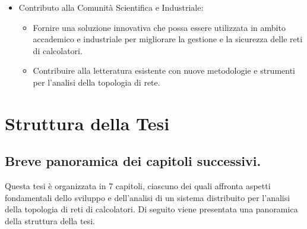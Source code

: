 \documentclass[target=bach,aauheader=,style=]{thud}
\begin{document}
\begin{itemize}


  \item Contributo alla Comunità Scientifica e Industriale:
    \begin{itemize}
      \item Fornire una soluzione innovativa che possa essere utilizzata in ambito accademico e industriale per migliorare la gestione e la sicurezza delle reti di calcolatori.
      \item Contribuire alla letteratura esistente con nuove metodologie e strumenti per l'analisi della topologia di rete.
    \end{itemize}

\end{itemize}



\section{Struttura della Tesi}
\subsection{Breve panoramica dei capitoli successivi.}
Questa tesi è organizzata in 7 capitoli, ciascuno dei quali affronta aspetti fondamentali dello sviluppo e dell'analisi di un sistema distribuito per l'analisi della topologia di reti di calcolatori. Di seguito viene presentata una panoramica della struttura della tesi.
\end{document}

